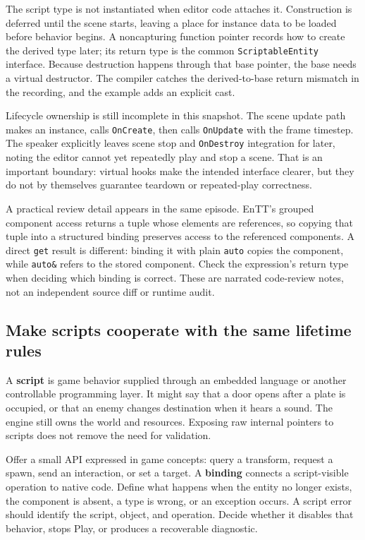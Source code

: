 The script type is not instantiated when editor code attaches it. Construction is deferred until the scene starts, leaving a place for instance data to be loaded before behavior begins. A noncapturing function pointer records how to create the derived type later; its return type is the common \texttt{ScriptableEntity} interface. Because destruction happens through that base pointer, the base needs a virtual destructor. The compiler catches the derived-to-base return mismatch in the recording, and the example adds an explicit cast.

Lifecycle ownership is still incomplete in this snapshot. The scene update path makes an instance, calls \texttt{OnCreate}, then calls \texttt{OnUpdate} with the frame timestep. The speaker explicitly leaves scene stop and \texttt{OnDestroy} integration for later, noting the editor cannot yet repeatedly play and stop a scene. That is an important boundary: virtual hooks make the intended interface clearer, but they do not by themselves guarantee teardown or repeated-play correctness.

A practical review detail appears in the same episode. EnTT's grouped component access returns a tuple whose elements are references, so copying that tuple into a structured binding preserves access to the referenced components. A direct \texttt{get} result is different: binding it with plain \texttt{auto} copies the component, while \texttt{auto\&} refers to the stored component. Check the expression's return type when deciding which binding is correct. These are narrated code-review notes, not an independent source diff or runtime audit.

\subsection{Make scripts cooperate with the same lifetime rules}\label{06-engine-ii-ch040-make-scripts-cooperate-with-the-same-lifetime-rules}

\hypertarget{06-engine-ii-ch040-make-scripts-cooperate-with-the-same-lifetime-rules}{}

A \textbf{script} is game behavior supplied through an embedded language or another controllable programming layer. It might say that a door opens after a plate is occupied, or that an enemy changes destination when it hears a sound. The engine still owns the world and resources. Exposing raw internal pointers to scripts does not remove the need for validation.

Offer a small API expressed in game concepts: query a transform, request a spawn, send an interaction, or set a target. A \textbf{binding} connects a script-visible operation to native code. Define what happens when the entity no longer exists, the component is absent, a type is wrong, or an exception occurs. A script error should identify the script, object, and operation. Decide whether it disables that behavior, stops Play, or produces a recoverable diagnostic.

